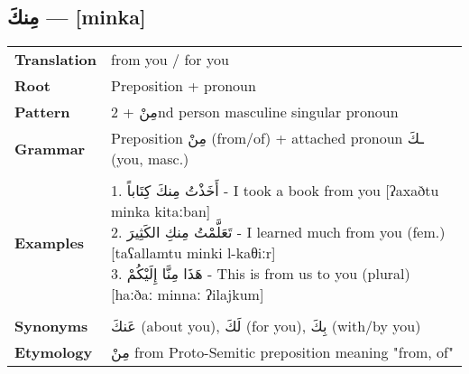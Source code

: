 \documentclass[letterpaper,12pt]{article}
\begin{document}
\subsection{\textarabic{مِنكَ} — [minka]}

\begin{tabular}{p{3cm}p{10cm}}
\toprule
\textbf{Translation} & from you / for you \\
\textbf{Root} & Preposition + pronoun \\
\textbf{Pattern} & \textarabic{مِنْ} + 2nd person masculine singular pronoun \\
\textbf{Grammar} & Preposition \textarabic{مِنْ} (from/of) + attached pronoun \textarabic{ـكَ} (you, masc.) \\
\midrule \\
\textbf{Examples} & \makecell[l]{\parbox{9.5cm}{
1. \textarabic{أَخَذْتُ مِنكَ كِتَاباً} - I took a book from you [ʔaxaðtu minka kitaːban]\\
2. \textarabic{تَعَلَّمْتُ مِنكِ الكَثِيرَ} - I learned much from you (fem.) [taʕallamtu minki l-kaθiːr]\\
3. \textarabic{هَذَا مِنَّا إِلَيْكُمْ} - This is from us to you (plural) [haːðaː minnaː ʔilajkum]
}} \\
\midrule \\
\textbf{Synonyms} & \textarabic{عَنكَ} (about you), \textarabic{لَكَ} (for you), \textarabic{بِكَ} (with/by you) \\
\textbf{Etymology} & \textarabic{مِنْ} from Proto-Semitic preposition meaning "from, of" \\
\bottomrule
\end{tabular}

\end{document}
